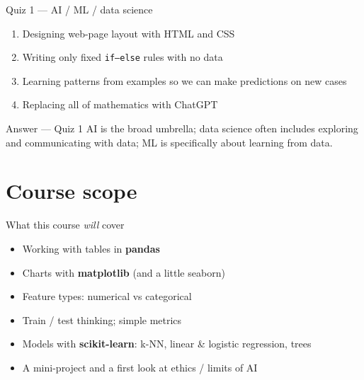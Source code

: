 \documentclass[aspectratio=169,11pt]{beamer}
\begin{document}
    \begin{frame}{Quiz 1 --- AI / ML / data science}
        \begin{enumerate}
            \item Designing web-page layout with HTML and CSS
            \item Writing only fixed \texttt{if--else} rules with no data
            \item Learning patterns from examples so we can make predictions on new cases
            \item Replacing all of mathematics with ChatGPT
        \end{enumerate}
        \quizpause
    \end{frame}

    \begin{frame}{Answer --- Quiz 1}
        \vspace{0.4em}
        AI is the broad umbrella; data science often includes exploring and communicating with data;
        ML is specifically about learning from data.
    \end{frame}

    \section{Course scope}

    \begin{frame}{What this course \emph{will} cover}
        \begin{itemize}
            \item Working with tables in \textbf{pandas}
            \item Charts with \textbf{matplotlib} (and a little seaborn)
            \item Feature types: numerical vs categorical
            \item Train / test thinking; simple metrics
            \item Models with \textbf{scikit-learn}: k-NN, linear \& logistic regression, trees
            \item A mini-project and a first look at ethics / limits of AI
        \end{itemize}
    \end{frame}
\end{document}
